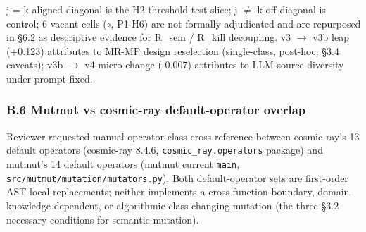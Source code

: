 \documentclass[review,12pt,authoryear]{elsarticle}
\begin{document}
j = k aligned diagonal is the H2 threshold-test slice; j $\neq$ k
off-diagonal is control; 6 vacant cells ($\circ$, P1 H6) are not formally
adjudicated and are repurposed in §6.2 as descriptive evidence for
R\_sem / R\_kill decoupling. v3 $\to$ v3b leap (+0.123) attributes to MR-MP
design reselection (single-class, post-hoc; §3.4 caveats); v3b $\to$ v4
micro-change (-0.007) attributes to LLM-source diversity under
prompt-fixed.

\subsubsection{B.6 Mutmut vs cosmic-ray default-operator
overlap}\label{b.6-mutmut-vs-cosmic-ray-default-operator-overlap}

Reviewer-requested manual operator-class cross-reference between
cosmic-ray's 13 default operators (cosmic-ray 8.4.6,
\texttt{cosmic\_ray.operators} package) and mutmut's 14 default
operators (mutmut current \texttt{main},
\texttt{src/mutmut/mutation/mutators.py}). Both default-operator sets
are first-order AST-local replacements; neither implements a
cross-function-boundary, domain-knowledge-dependent, or
algorithmic-class-changing mutation (the three §3.2 necessary conditions
for semantic mutation).
\end{document}

